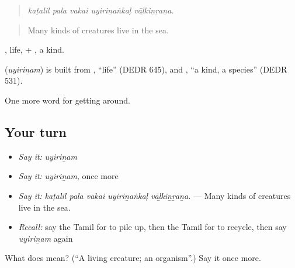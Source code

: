 \begin{quote}
\emph{kaṭalil pala vakai uyiriṉaṅkaḷ vāḻkiṉṟaṉa.}
\end{quote}

\begin{quote}
Many kinds of creatures live in the sea.
\end{quote}

, life, + , a kind.

\begin{cousinweb}
\textbf{} (\emph{uyiriṉam}) is built from , \textquotedblleft{}life\textquotedblright{} (DEDR 645), and , \textquotedblleft{}a kind, a species\textquotedblright{} (DEDR 531).
\end{cousinweb}

\begin{grammarlens}[title={What you've built}]
One more word for getting around.
\end{grammarlens}

\subsection*{Your turn}
\begin{itemize}
\raggedright
  \item \emph{Say it:} \emph{uyiriṉam}
  \item \emph{Say it:} \emph{uyiriṉam}, once more
  \item \emph{Say it:} \emph{kaṭalil pala vakai uyiriṉaṅkaḷ vāḻkiṉṟaṉa.} — Many kinds of creatures live in the sea.
  \item \emph{Recall:} say the Tamil for to pile up, then the Tamil for to recycle, then say \emph{uyiriṉam} again
\end{itemize}

\begin{tcolorbox}[breakable,colback=teal!4,colframe=teal!35!black,title={Before you move on}]
What does  mean? (\textquotedblleft{}A living creature; an organism\textquotedblright{}.) Say it once more.
\end{tcolorbox}
